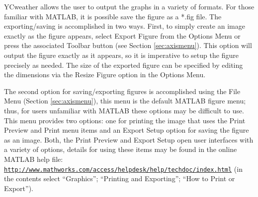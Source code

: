 \label{sec:exportfig}
YCweather allows the user to output the graphs in a variety of formats.  For those familiar with MATLAB, it is possible save the figure as a *.fig file.  The exporting/saving is accomplished in two ways.  First, to simply create an image exactly as the figure appears, select Export Figure from the Options Menu or press the associated Toolbar button (see Section \ref{sec:axismenu}).  This option will output the figure exactly as it appears, so it is imperative to setup the figure precisely as needed.  The size of the exported figure can be specified by editing the dimensions via the Resize Figure option in the Options Menu.

The second option for saving/exporting figures is accomplished using the File Menu (Section \ref{sec:axismenu}), this menu is the default MATLAB figure menu; thus, for users unfamiliar with MATLAB these options may be difficult to use.  This menu provides two options: one for printing the image that uses the Print Preview and Print menu items and an Export Setup option for saving the figure as an image.  Both, the Print Preview and Export Setup open user interfaces with a variety of options, details for using these items may be found in the online MATLAB help file: \href{http://www.mathworks.com/access/helpdesk/help/techdoc/index.html}{\nolinkurl{http://www.mathworks.com/access/helpdesk/help/techdoc/index.html}} (in the contents select ``Graphics''; ``Printing and Exporting''; ``How to Print or Export'').

